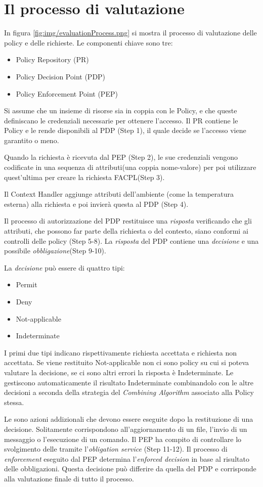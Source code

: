 \section{Il processo di valutazione}
\label{sec:Il processo di valutazione}
In figura \ref{fig:img/evaluationProcess.png} si mostra il processo di valutazione delle policy e delle richieste. Le componenti chiave sono tre:
\begin{itemize}
  \item Policy Repository (PR)
  \item Policy Decision Point (PDP)
  \item Policy Enforcement Point (PEP)
\end{itemize}
Si assume che un insieme di risorse sia in coppia con le Policy, e che queste definiscano le credenziali
necessarie per ottenere l'accesso. Il PR contiene le Policy e le rende disponibili al PDP (Step 1), il
quale decide se l'accesso viene garantito o meno. \par
Quando la richiesta è ricevuta dal PEP (Step 2), le sue credenziali vengono codificate in una sequenza
di attributi(una coppia nome-valore) per poi utilizzare quest'ultima per creare la richiesta FACPL(Step 3).\par
Il Context Handler aggiunge attributi dell'ambiente (come la temperatura esterna) alla richiesta e
poi invierà questa al PDP (Step 4).\par
Il processo di autorizzazione del PDP restituisce una \emph{risposta} verificando che gli attributi, che possono far
parte della richiesta o del contesto, siano conformi ai controlli delle policy (Step 5-8). La \emph{risposta} del PDP
contiene una \emph{decisione} e una possibile \emph{obbligazione}(Step 9-10).\par
La \emph{decisione} può essere di quattro tipi:
\begin{itemize}
  \item Permit
  \item Deny
  \item Not-applicable
  \item Indeterminate
\end{itemize}
I primi due tipi indicano rispettivamente richiesta accettata e richiesta non accettata. Se viene restituito Not-applicable
non ci sono policy su cui si poteva valutare la decisione, se ci sono altri errori la risposta è Indeterminate.
Le \ePolicy gestiscono automaticamente il risultato Indeterminate combinandolo con le altre decisioni
a seconda della strategia del \emph{Combining Algorithm} associato alla Policy stessa.\par
Le \eObligations sono azioni addizionali che devono essere eseguite dopo la restituzione di una decisione.
Solitamente corrispondono all'aggiornamento di un file, l'invio di un messaggio o l'esecuzione di un comando.
Il PEP ha compito di controllare lo svolgimento delle \eObligations tramite l'\emph{obligation service} (Step 11-12).
Il processo di \emph{enforcement} eseguito dal PEP determina l'\emph{enforced decision} in base al risultato delle obbligazioni.
Questa decisione può differire da quella del PDP e corrisponde alla valutazione finale di tutto il processo.


